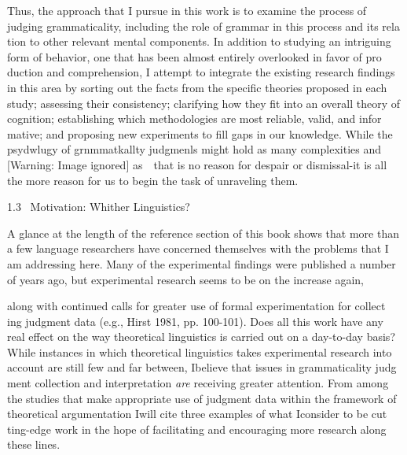 \begin{styleTextbody}
Thus, the approach that I pursue in this work is to examine the process of judging grammaticality, including the role of grammar in this process and its rela\- tion to other relevant mental components. In addition to studying an intriguing form of behavior, one that has been almost entirely overlooked in favor of pro\- duction and comprehension, I attempt to integrate the existing research findings in this area by sorting out the facts from the specific theories proposed in each study; assessing their consistency; clarifying how they fit into an overall theory of cognition; establishing which methodologies are most reliable, valid, and infor\- mative; and proposing new experiments to fill gaps in our knowledge. While the psydwlugy of grnmmatkallty judgmenls might hold as many complexities and   [Warning: Image ignored] %
  as\ \ that is no reason for despair or dismissal{}-it is all the more reason for us to begin the task of unraveling them.
\end{styleTextbody}


\begin{styleHeadingvii}
1.3 \ Motivation: Whither Linguistics?
\end{styleHeadingvii}


\begin{styleTextbody}
A glance at the length of the reference section of this book shows that more than a few language researchers have concerned themselves with the problems that I am addressing here. Many of the experimental findings were published a number of years ago, but experimental research seems to be on the increase again,
\end{styleTextbody}


\clearpage\setcounter{page}{1}\begin{styleTextbody}
along with continued calls for greater use of formal experimentation for collect\- ing judgment data (e.g., Hirst 1981, pp. 100-101). Does all this work have any real effect on the way theoretical linguistics is carried out on a day-to-day basis? While instances in which theoretical linguistics takes experimental research into account are still few and far between, Ibelieve that issues in grammaticality judg\- ment collection and interpretation \textit{are}\textit{ }receiving greater attention. From among the studies that make appropriate use of judgment data within the framework of theoretical argumentation Iwill cite three examples of what Iconsider to be cut\- ting-edge work in the hope of facilitating and encouraging more research along these lines.
\end{styleTextbody}


